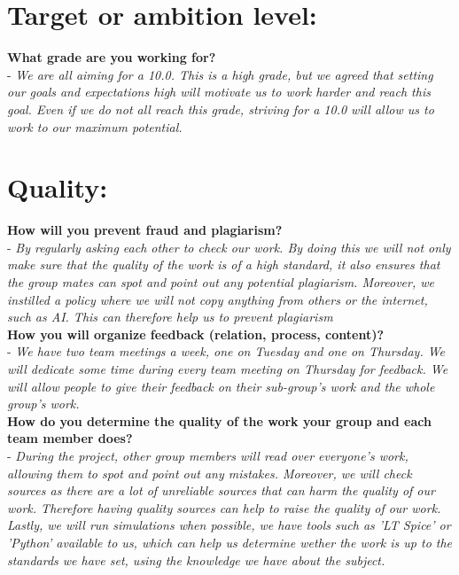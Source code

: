 \section*{\textcolor{Delft_Blue}{\textbf{Target or ambition level:\vspace{5pt}}}}
\textbf{What grade are you working for?}\\
    - \textit{We are all aiming for a 10.0. This is a high grade, but we agreed that setting our goals and expectations high will motivate us to work harder and reach this goal. Even if we do not all reach this grade, striving for a 10.0 will allow us to work to our maximum potential.}\\
\newpage
\section*{\textcolor{Delft_Blue}{\textbf{Quality:\vspace{5pt}}}}
\textbf{How will you prevent fraud and plagiarism?}\\
    - \textit{By regularly asking each other to check our work. By doing this we will not only make sure that the quality of the work is of a high standard, it also ensures that the group mates can spot and point out any potential plagiarism. Moreover, we instilled a policy where we will not copy anything from others or the internet, such as AI. This can therefore help us to prevent plagiarism }\\
    
\textbf{How you will organize feedback (relation, process, content)?}\\
    - \textit{We have two team meetings a week, one on Tuesday and one on Thursday. We will dedicate some time during every team meeting on Thursday for feedback. We will allow people to give their feedback on their sub-group's work and the whole group's work.}\\

\textbf{How do you determine the quality of the work your group and each team member does?}\\
    - \textit{During the project, other group members will read over everyone's work, allowing them to spot and point out any mistakes. Moreover, we will check sources as there are a lot of unreliable sources that can harm the quality of our work. Therefore having quality sources can help to raise the quality of our work. Lastly, we will run simulations when possible, we have tools such as 'LT Spice' or 'Python' available to us, which can help us determine wether the work is up to the standards we have set, using the knowledge we have about the subject.}\\
    

